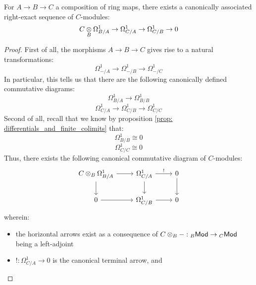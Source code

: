                 \begin{proposition} \label{prop: canonical_exact_sequence_of_differentials}
                    For $A \to B \to C$ a composition of ring maps, there exists a canonically associated right-exact sequence of $C$-modules:
                        $$C \tensor_B \Omega^1_{B/A} \to \Omega^1_{C/A} \to \Omega^1_{C/B} \to 0$$
                \end{proposition}
                    \begin{proof}
                        First of all, the morphisms $A \to B \to C$ gives rise to a natural transformations:
                            $$\Omega^1_{-/A} \to \Omega^1_{-/B} \to \Omega^1_{-/C}$$
                        In particular, this tells us that there are the following canonically defined commutative diagrams:
                            $$\Omega^1_{B/A} \to \Omega^1_{B/B}$$
                            $$\Omega^1_{C/A} \to \Omega^1_{C/B} \to \Omega^1_{C/C}$$
                        Second of all, recall that we know by proposition \ref{prop: differentials_and_finite_colimits} that:
                            $$\Omega^1_{B/B} \cong 0$$
                            $$\Omega^1_{C/C} \cong 0$$
                        Thus, there exists the following canonical commutative diagram of $C$-modules:
                            $$
                                \begin{tikzcd}
                                	{C \tensor_B \Omega^1_{B/A}} & {\Omega^1_{C/A}} & 0 \\
                                	0 & {\Omega^1_{C/B}} & 0
                                	\arrow[from=1-2, to=2-2]
                                	\arrow[from=1-1, to=2-1]
                                	\arrow[from=2-1, to=2-2]
                                	\arrow[from=1-1, to=1-2]
                                	\arrow[from=2-2, to=2-3]
                                	\arrow["{!}", from=1-2, to=1-3]
                                	\arrow[from=1-3, to=2-3]
                                \end{tikzcd}
                            $$
                        wherein:
                            \begin{itemize}
                                \item the horizontal arrows exist as a consequence of $C \tensor_B -: {}_B\Mod \to {}_C\Mod$ being a left-adjoint
                                \item $!: \Omega^1_{C/A} \to 0$ is the canonical terminal arrow, and

\end{itemize}
\end{proof}
